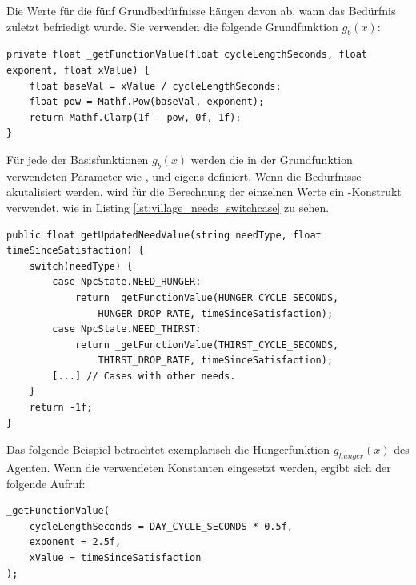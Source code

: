 Die Werte für die fünf Grundbedürfnisse hängen davon ab, wann das Bedürfnis zuletzt befriedigt wurde. Sie verwenden die folgende Grundfunktion $g_b(x)$:

\begin{minipage}{\linewidth}
\begin{lstlisting}[linewidth=16.4cm, label=lst:village_needs_base_function, caption=Grundfunktion für die Abnahme der Grundbedürfnisse, xleftmargin=1cm]
private float _getFunctionValue(float cycleLengthSeconds, float exponent, float xValue) {
    float baseVal = xValue / cycleLengthSeconds;
    float pow = Mathf.Pow(baseVal, exponent);
    return Mathf.Clamp(1f - pow, 0f, 1f);
}
\end{lstlisting}
\end{minipage}

Für jede der Basisfunktionen $g_b(x)$ werden die in der Grundfunktion verwendeten Parameter wie ,  und  eigens definiert. Wenn die Bedürfnisse akutalisiert werden, wird für die Berechnung der einzelnen Werte ein -Konstrukt verwendet, wie in Listing \ref{lst:village_needs_switchcase} zu sehen.

\begin{minipage}{\linewidth}
\begin{lstlisting}[linewidth=16.4cm, label=lst:village_needs_switchcase, caption=Aufruf der Grundfunktion bei einer Anpassung der Bedürfnisse, xleftmargin=1cm]
public float getUpdatedNeedValue(string needType, float timeSinceSatisfaction) {
    switch(needType) {
        case NpcState.NEED_HUNGER:
            return _getFunctionValue(HUNGER_CYCLE_SECONDS,
                HUNGER_DROP_RATE, timeSinceSatisfaction);
        case NpcState.NEED_THIRST:
            return _getFunctionValue(THIRST_CYCLE_SECONDS,
                THIRST_DROP_RATE, timeSinceSatisfaction);
        [...] // Cases with other needs.
    }
    return -1f;
}
\end{lstlisting}
\end{minipage}


Das folgende Beispiel betrachtet exemplarisch die Hungerfunktion $g_{hunger}(x)$ des Agenten. Wenn die verwendeten Konstanten eingesetzt werden, ergibt sich der folgende Aufruf:

\begin{minipage}{\linewidth}
\begin{lstlisting}[linewidth=16.4cm, label=lst:village_needs_hunger_call, caption=Aufruf der Grundfunktion bei einer Anpassung der Bedürfnisse, xleftmargin=1cm]
_getFunctionValue(
    cycleLengthSeconds = DAY_CYCLE_SECONDS * 0.5f,
    exponent = 2.5f,
    xValue = timeSinceSatisfaction
);
\end{lstlisting}
\end{minipage}

